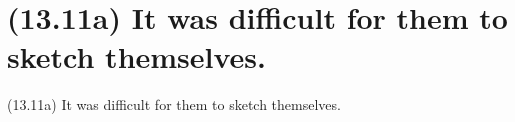 \documentclass{article}
\begin{document}
\bigbreak
\vbox{}
\bigbreak

\clearpage

%
%

\section*{(13.11a) It was difficult for them to sketch themselves.}

\bigbreak
\begin{enumerate*}
\item[(13.11a)] It was difficult for them to sketch themselves.
\end{enumerate*}
\bigbreak
\end{document}
